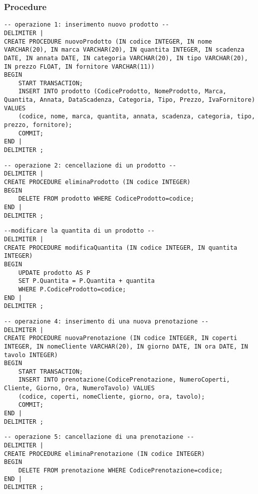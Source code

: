 \subsubsection{Procedure}
\begin{lstlisting}[title=Operazione 1, style=mysqlStyle]
-- operazione 1: inserimento nuovo prodotto --
DELIMITER |
CREATE PROCEDURE nuovoProdotto (IN codice INTEGER, IN nome VARCHAR(20), IN marca VARCHAR(20), IN quantita INTEGER, IN scadenza DATE, IN annata DATE, IN categoria VARCHAR(20), IN tipo VARCHAR(20), IN prezzo FLOAT, IN fornitore VARCHAR(11))
BEGIN
    START TRANSACTION;
    INSERT INTO prodotto (CodiceProdotto, NomeProdotto, Marca, Quantita, Annata, DataScadenza, Categoria, Tipo, Prezzo, IvaFornitore) VALUES
    (codice, nome, marca, quantita, annata, scadenza, categoria, tipo, prezzo, fornitore);
    COMMIT;
END |
DELIMITER ;
\end{lstlisting}

\begin{lstlisting}[title=Operazione 2, style=mysqlStyle]
-- operazione 2: cencellazione di un prodotto --
DELIMITER |
CREATE PROCEDURE eliminaProdotto (IN codice INTEGER)
BEGIN
    DELETE FROM prodotto WHERE CodiceProdotto=codice;
END |
DELIMITER ;
\end{lstlisting}

\begin{lstlisting}[title=Operazione 3, style=mysqlStyle]
--modificare la quantita di un prodotto --
DELIMITER |
CREATE PROCEDURE modificaQuantita (IN codice INTEGER, IN quantita INTEGER)
BEGIN
    UPDATE prodotto AS P
    SET P.Quantita = P.Quantita + quantita
    WHERE P.CodiceProdotto=codice;
END |
DELIMITER ;
\end{lstlisting}

\begin{lstlisting}[title=Operazione 4, style=mysqlStyle]
-- operazione 4: inserimento di una nuova prenotazione --
DELIMITER |
CREATE PROCEDURE nuovaPrenotazione (IN codice INTEGER, IN coperti INTEGER, IN nomeCliente VARCHAR(20), IN giorno DATE, IN ora DATE, IN tavolo INTEGER)
BEGIN
    START TRANSACTION;
    INSERT INTO prenotazione(CodicePrenotazione, NumeroCoperti, Cliente, Giorno, Ora, NumeroTavolo) VALUES
    (codice, coperti, nomeCliente, giorno, ora, tavolo);
    COMMIT;
END |
DELIMITER ;
\end{lstlisting}

\begin{lstlisting}[title=Operazione 5, style=mysqlStyle]
-- operazione 5: cancellazione di una prenotazione --
DELIMITER |
CREATE PROCEDURE eliminaPrenotazione (IN codice INTEGER)
BEGIN
    DELETE FROM prenotazione WHERE CodicePrenotazione=codice;
END |
DELIMITER ;
\end{lstlisting}

